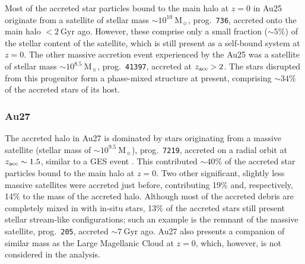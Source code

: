 Most of the accreted star particles bound to the main halo at $z=0$ in Au25 originate from a satellite of stellar mass $\sim10^{10}~\mathrm{M_{\sun}}$, prog.~\texttt{736}, accreted onto the main halo $<2~\mathrm{Gyr}$ ago. However, these comprise only a small fraction ($\sim5\%$) of the stellar content of the satellite, which is still present as a self-bound system at $z=0$. The other massive accretion event experienced by the Au25 was a satellite of stellar mass $\sim10^{8.5}~\mathrm{M_{\sun}}$, prog.~\texttt{41397}, accreted at $z_{\rm acc}>2$. The stars disrupted from this progenitor form a phase-mixed structure at present, comprising $\sim34\%$ of the accreted stars of its host.

\subsubsection{Au27}

The accreted halo in Au27 is dominated by stars originating from a massive satellite (stellar mass of $\sim10^{9.5}~\mathrm{M_{\sun}}$),  prog.~\texttt{7219}, accreted on a radial orbit at $z_{\rm acc}\sim1.5$, similar to a GES event \citep{Helmi2018,Belokurov2018}. This contributed $\sim40\%$ of the accreted star particles bound to the main halo at $z=0$. Two other significant, slightly less massive satellites were accreted just before, contributing 19\% and, respectively, 14\% to the mass of the accreted halo. Although most of the accreted debris are completely mixed in with in-situ stars, 13\% of the accreted stars still present stellar stream-like configurations; such an example is the remnant of the massive satellite,  prog.~\texttt{205}, accreted $\sim 7~\mathrm{Gyr}$ ago. Au27 also presents a companion of similar mass as the Large Magellanic Cloud at $z=0$, which, however, is not considered in the analysis.

